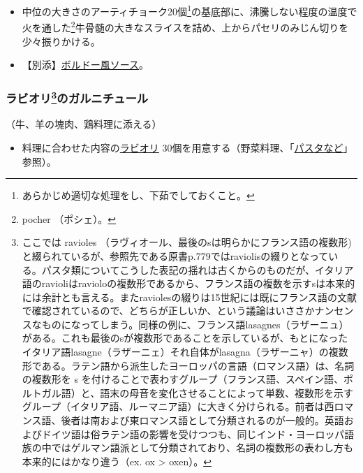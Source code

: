 \begin{recette}
\begin{itemize}
\item
  中位の大きさのアーティチョーク20個\footnote{あらかじめ適切な処理をし、下茹でしておくこと。}の基底部に、沸騰しない程度の温度で火を通した\footnote{pocher
    （ポシェ）。}牛骨髄の大きなスライスを詰め、上からパセリのみじん切りを少々振りかける。
\item
  【別添】\protect\hyperlink{sauce-bordelaise}{ボルドー風ソース}。
\end{itemize}

\atoaki{}

\hypertarget{garniture-de-ravioles}{%
\subsubsection[ラビオリのガルニチュール]{\texorpdfstring{ラビオリ\footnote{ここでは
  ravioles
  （ラヴィオール、最後のsは明らかにフランス語の複数形)と綴られているが、参照先である原書p.779ではraviolisの綴りとなっている。パスタ類についてこうした表記の揺れは古くからのものだが、イタリア語のravioliはravioloの複数形であるから、フランス語の複数を示すsは本来的には余計とも言える。またraviolesの綴りは15世紀には既にフランス語の文献で確認されているので、どちらが正しいか、という議論はいささかナンセンスなものになってしまう。同様の例に、フランス語lasagnes（ラザーニュ）がある。これも最後のsが複数形であることを示しているが、もとになったイタリア語lasagne（ラザーニェ）それ自体がlasagna（ラザーニャ）の複数形である。ラテン語から派生したヨーロッパの言語（ロマンス語）は、名詞の複数形を
  s
  を付けることで表わすグループ（フランス語、スペイン語、ポルトガル語）と、語末の母音を変化させることによって単数、複数形を示すグループ（イタリア語、ルーマニア語）に大きく分けられる。前者は西ロマンス語、後者は南および東ロマンス語として分類されるのが一般的。英語およびドイツ語は俗ラテン語の影響を受けつつも、同じインド・ヨーロッパ語族の中ではゲルマン語派として分類されており、名詞の複数形の表わし方も本来的にはかなり違う（ex.
  ox \textgreater{} oxen）。}のガルニチュール}{ラビオリのガルニチュール}}\label{garniture-de-ravioles}}



（牛、羊の塊肉、鶏料理に添える）

\begin{itemize}
\tightlist
\item
  料理に合わせた内容の\protect\hyperlink{raviolis}{ラビオリ}
  30個を用意する（野菜料理、「\protect\hyperlink{farineux-et-pates-alimentaires}{パスタなど}」参照）。
\end{itemize}


\end{recette}
